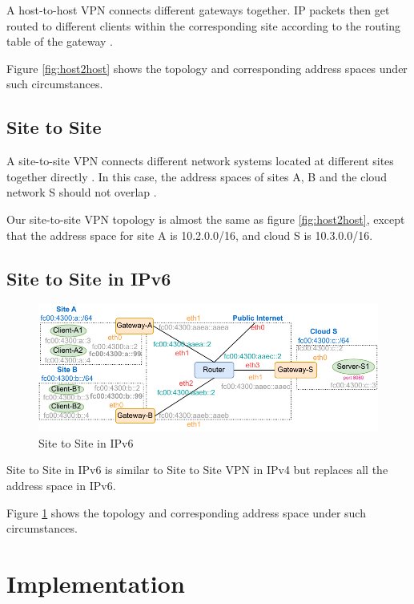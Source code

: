\documentclass[article]{aaltoseries}
\begin{document}
A host-to-host VPN connects different gateways together. IP packets then get routed to different clients within the corresponding site according to the routing table of the gateway \cite{meng2013implementation}.

Figure \ref{fig:host2host} shows the topology and corresponding address spaces under such circumstances.

\subsection{Site to Site}

A site-to-site VPN connects different network systems located at different sites together directly \cite{9022848}. In this case, the address spaces of sites A, B and the cloud network S should not overlap \cite{AKYILDIZ2023100695}.

Our site-to-site VPN topology is almost the same as figure \ref{fig:host2host}, except that the address space for site A is 10.2.0.0/16, and cloud S is 10.3.0.0/16.

\subsection{Site to Site in IPv6}
\begin{figure}[t!]
  \begin{center}
    \includegraphics{figures/ipv6-site-to-site.pdf}
    \caption{Site to Site in IPv6}
    \label{fig:ipv6site2site}
  \end{center}
\end{figure}

Site to Site in IPv6 is similar to Site to Site VPN in IPv4 but replaces all the address space in IPv6.

Figure \ref{fig:ipv6site2site} shows the topology and corresponding address space under such circumstances.



\section{Implementation}
\end{document}
